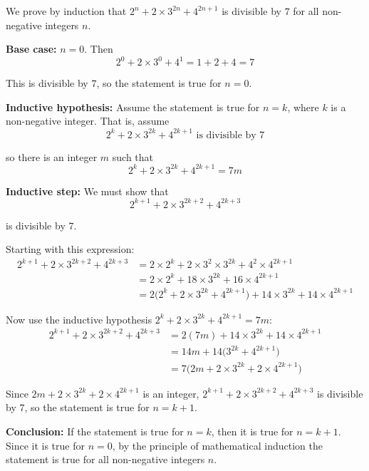 \documentclass[leqno]{article}
\begin{document}
\begin{enumerate}[
  label=\textbf{\arabic*.},
  leftmargin=*,
  topsep=0pt,
  partopsep=0pt,
  parsep=0pt
]
\vspace*{10pt}

\begin{djsSolution}
We prove by induction that \(2^n + 2\times 3^{2n} + 4^{2n+1}\) is divisible by \(7\) for all non-negative integers \(n\).

\textbf{Base case:} \(n=0\). Then
\[
2^0 + 2\times 3^0 + 4^1 = 1+2+4=7
\]

This is divisible by \(7\), so the statement is true for \(n=0\).

\textbf{Inductive hypothesis:} Assume the statement is true for \(n=k\), where \(k\) is a non-negative integer. That is, assume
\[
2^k + 2\times 3^{2k} + 4^{2k+1} \text{ is divisible by } 7
\]

so there is an integer \(m\) such that
\[
2^k + 2\times 3^{2k} + 4^{2k+1} = 7m
\]

\textbf{Inductive step:} We must show that
\[
2^{k+1} + 2\times 3^{2k+2} + 4^{2k+3}
\]

is divisible by \(7\).

Starting with this expression:
\begin{align*}
2^{k+1} + 2\times 3^{2k+2} + 4^{2k+3}
&= 2\times 2^k + 2\times 3^2\times 3^{2k} + 4^2\times 4^{2k+1} \\
&= 2\times 2^k + 18\times 3^{2k} + 16\times 4^{2k+1} \\
&= 2\bigl(2^k + 2\times 3^{2k} + 4^{2k+1}\bigr) + 14\times 3^{2k} + 14\times 4^{2k+1}
\end{align*}

Now use the inductive hypothesis \(2^k + 2\times 3^{2k} + 4^{2k+1}=7m\):
\begin{align*}
2^{k+1} + 2\times 3^{2k+2} + 4^{2k+3}
&= 2(7m) + 14\times 3^{2k} + 14\times 4^{2k+1} \\
&= 14m + 14\bigl(3^{2k} + 4^{2k+1}\bigr) \\
&= 7\bigl(2m + 2\times 3^{2k} + 2\times 4^{2k+1}\bigr)
\end{align*}

Since \(2m + 2\times 3^{2k} + 2\times 4^{2k+1}\) is an integer, \(2^{k+1} + 2\times 3^{2k+2} + 4^{2k+3}\) is divisible by \(7\), so the statement is true for \(n=k+1\).

\textbf{Conclusion:} If the statement is true for \(n=k\), then it is true for \(n=k+1\). Since it is true for \(n=0\), by the principle of mathematical induction the statement is true for all non-negative integers \(n\).
\end{djsSolution}



\end{enumerate}
\end{document}
